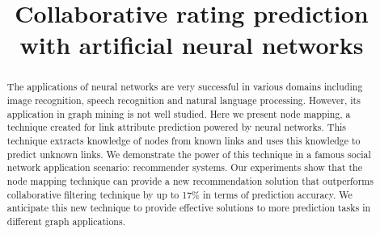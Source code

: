 \documentclass[twocolumn]{article}
\begin{document}
\lstset{language=python, tabsize=4}
\title{Collaborative rating prediction with artificial neural networks}

\maketitle

\begin{abstract}
	The applications of neural networks are very successful in various domains 
	including image recognition, speech recognition and natural language 
	processing.
	However, its application in graph mining is not well studied.
	Here we present node mapping, a technique created for link attribute 
	prediction powered by neural networks.
	This technique extracts knowledge of nodes from known links and uses this 
	knowledge to predict unknown links.
	We demonstrate the power of this technique in a famous social network 
	application scenario: recommender systems.
	Our experiments show that the node mapping technique can provide a new
	recommendation solution that outperforms collaborative filtering 
	technique by up to 17\% in terms of prediction accuracy.
	We anticipate this new technique to provide effective solutions to more 
	prediction tasks in different graph applications.
\end{abstract}
\end{document}

